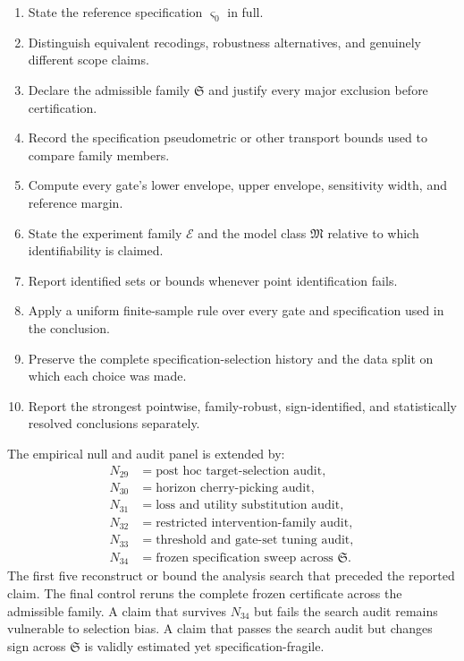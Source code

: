 \begin{enumerate}
\item State the reference specification \(\varsigma_0\) in full.
\item Distinguish equivalent recodings, robustness alternatives, and genuinely
 different scope claims.
\item Declare the admissible family \(\mathfrak S\) and justify every major
 exclusion before certification.
\item Record the specification pseudometric or other transport bounds used to
 compare family members.
\item Compute every gate's lower envelope, upper envelope, sensitivity width,
 and reference margin.
\item State the experiment family \(\mathcal E\) and the model class
 \(\mathfrak M\) relative to which identifiability is claimed.
\item Report identified sets or bounds whenever point identification fails.
\item Apply a uniform finite-sample rule over every gate and specification used
 in the conclusion.
\item Preserve the complete specification-selection history and the data split
 on which each choice was made.
\item Report the strongest pointwise, family-robust, sign-identified, and
 statistically resolved conclusions separately.
\end{enumerate}


The empirical null and audit panel is extended by:
\[
\begin{aligned}
N_{29}&=\text{post hoc target-selection audit},\\
N_{30}&=\text{horizon cherry-picking audit},\\
N_{31}&=\text{loss and utility substitution audit},\\
N_{32}&=\text{restricted intervention-family audit},\\
N_{33}&=\text{threshold and gate-set tuning audit},\\
N_{34}&=\text{frozen specification sweep across }\mathfrak S.
\end{aligned}
\]
The first five reconstruct or bound the analysis search that preceded the
reported claim. The final control reruns the complete frozen certificate across
the admissible family. A claim that survives \(N_{34}\) but fails the search
audit remains vulnerable to selection bias. A claim that passes the search
audit but changes sign across \(\mathfrak S\) is validly estimated yet
specification-fragile.

